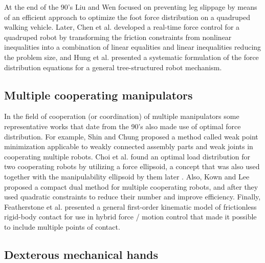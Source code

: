 		At the end of the 90's Liu and Wen \cite{LiuH_RoboticSystems1997} focused on preventing leg
		slippage by means of an efficient approach to optimize the foot force distribution on a quadruped
		walking vehicle.
		Later, Chen et al. \cite{Chen_MIRC1999} developed a real-time force control for a
		quadruped robot by transforming the friction constraints from nonlinear inequalities into a
		combination of linear	equalities and linear inequalities reducing the problem size, and
		Hung et al. \cite{Hung_SysManCyb2000} presented a systematic formulation of the force
		distribution equations for a general tree-structured robot mechanism.
		
	\subsection{Multiple cooperating manipulators}
		\label{sub:cooperating_manipulators}
	
		In the field of cooperation (or coordination) of multiple manipulators some representative works
		that date from the 90's also made use of optimal force distribution.
		For example, Shin and Chung \cite{Shin_IROS1991} proposed a method called weak point minimization
		applicable to weakly connected assembly parts and weak joints in cooperating multiple robots.
		Choi et al. \cite{Choi_ICRA1992} found an optimal load distribution for two cooperating robots by
		utilizing a force ellipsoid, a concept that was also used together with the manipulability ellipsoid
		by them later \cite{Choi_Robotica1993}.
		Also, Kown and Lee \cite{Kwon_SICE1996} proposed a compact dual method for multiple cooperating
		robots, and after they \cite{Kwon_IntellRobotSys1998} used quadratic constraints to reduce their
		number and improve efficiency.
		Finally, Featherstone et al. \cite{Featherstone_ICRA1999} presented a general first-order kinematic
		model of	frictionless rigid-body contact for use in hybrid force / motion control that made it
		possible to include multiple points of contact.
		
	\subsection{Dexterous mechanical hands}
		\label{sub:mechanical_hands}
		
